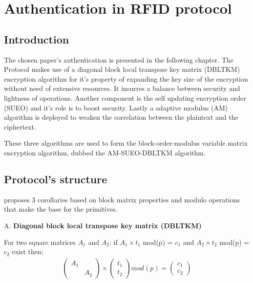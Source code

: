 \chapter{Authentication in RFID protocol}

\section{Introduction}
    The chosen paper\cite{BOM}'s authentication is presented in the following chapter. The Protocol makes use of a diagonal block local transpose key matrix (DBLTKM) 
    encryption algorithm for it's property of 
    expanding the key size of the encryption without need of extensive resources. It insurres a balance between security and lightness of operations. 
    Another component is the self updating encryption 
    order (SUEO) and it's role is to boost security. Lastly a adaptive modulus (AM) algorithm is deployed to weaken the correlation between the 
    plaintext and the ciphertext.
    
    These three algorithms are used to form the block-order-modulus variable matrix encryption algorithm, dubbed the AM-SUEO-DBLTKM algorithm.

\section{Protocol's structure}

    \cite{BOM} proposes 3 corollaries based on block matrix properties and modulo operations that make the base for the primitives.

    A. \textbf{Diagonal block local transpose key matrix (DBLTKM)}

    For two square matrices $A_1$ and $A_2$: if $A_1 \times t_1$ mod(p) = $c_1$ and $A_2 \times t_2$ mod(p) = $c_2$ exist then:
    \begin{gather*}
        \begin{pmatrix}
        A_1 &  \\
            & A_2
        \end{pmatrix}
        \times
        \begin{pmatrix}
            t_1  \\
            t_2
        \end{pmatrix}
        mod(p)
        =
        \begin{pmatrix}
            c_1  \\
            c_2
        \end{pmatrix}
    \end{gather*}

